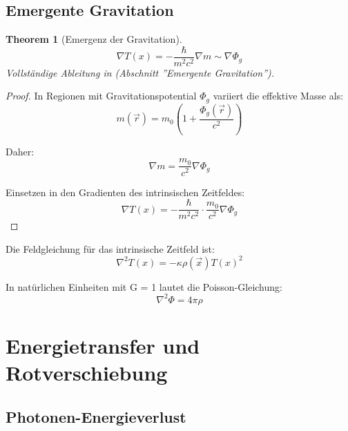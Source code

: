 \documentclass[a4paper,12pt]{article}
\newtheorem{theorem}{Theorem}[section]
\theoremstyle{definition}
\theoremstyle{remark}
\newcommand{\Tfield}{T(x)}
\newcommand{\vecx}{\vec{x}}
\begin{document}
	\subsection{Emergente Gravitation}
	
	\begin{theorem}[Emergenz der Gravitation]
		\begin{equation}
			\nabla \Tfield = -\frac{\hbar}{m^2 c^2} \nabla m \sim \nabla \Phi_g
		\end{equation}
		Vollständige Ableitung in \cite{pascher_galaxies_2025} (Abschnitt ''Emergente Gravitation'').
	\end{theorem}
	
	\begin{proof}
		In Regionen mit Gravitationspotential \(\Phi_g\) variiert die effektive Masse als:
		\begin{equation}
			m(\vec{r}) = m_0 \left(1 + \frac{\Phi_g(\vec{r})}{c^2}\right)
		\end{equation}
		
		Daher:
		\begin{equation}
			\nabla m = \frac{m_0}{c^2} \nabla \Phi_g
		\end{equation}
		
		Einsetzen in den Gradienten des intrinsischen Zeitfeldes:
		\begin{equation}
			\nabla \Tfield = -\frac{\hbar}{m^2 c^2} \cdot \frac{m_0}{c^2} \nabla \Phi_g
		\end{equation}
	\end{proof}
	
	Die Feldgleichung für das intrinsische Zeitfeld ist:
	\begin{equation}
		\nabla^2 \Tfield = -\kappa \rho(\vecx) \Tfield^2
	\end{equation}
	
	In natürlichen Einheiten mit G = 1 lautet die Poisson-Gleichung:
	\begin{equation}
		\nabla^2 \Phi = 4\pi \rho
	\end{equation}
	
	\section{Energietransfer und Rotverschiebung}
	
	\subsection{Photonen-Energieverlust}
	
\end{document}

